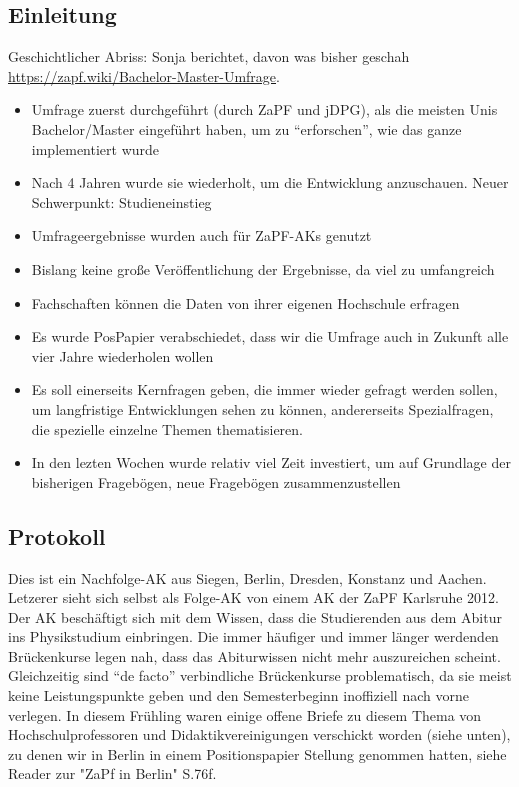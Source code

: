   \subsection*{Einleitung}
    Geschichtlicher Abriss: Sonja berichtet, davon was bisher geschah \url{https://zapf.wiki/Bachelor-Master-Umfrage}. \\
    \begin{itemize}
      \item Umfrage zuerst durchgeführt (durch ZaPF und jDPG), als die meisten Unis Bachelor/Master eingeführt haben, um zu “erforschen”, wie das ganze implementiert wurde
      \item Nach 4 Jahren wurde sie wiederholt, um die Entwicklung anzuschauen. Neuer Schwerpunkt: Studieneinstieg
      \item Umfrageergebnisse wurden auch für ZaPF-AKs genutzt
      \item Bislang keine große Veröffentlichung der Ergebnisse, da viel zu umfangreich
      \item Fachschaften können die Daten von ihrer eigenen Hochschule erfragen
      \item Es wurde PosPapier verabschiedet, dass wir die Umfrage auch in Zukunft alle vier Jahre wiederholen wollen
      \item Es soll einerseits Kernfragen geben, die immer wieder gefragt werden sollen, um langfristige Entwicklungen sehen zu können, andererseits Spezialfragen, die spezielle einzelne Themen thematisieren.
      \item In den lezten Wochen wurde relativ viel Zeit investiert, um auf Grundlage der bisherigen Fragebögen, neue Fragebögen zusammenzustellen
    \end{itemize}

  \subsection*{Protokoll}
    Dies ist ein Nachfolge-AK aus Siegen, Berlin, Dresden, Konstanz und Aachen. Letzerer sieht sich selbst als Folge-AK von einem AK der ZaPF Karlsruhe 2012. \\

    Der AK beschäftigt sich mit dem Wissen, dass die Studierenden aus dem Abitur ins Physikstudium einbringen. Die immer häufiger und immer länger werdenden Brückenkurse legen nah, dass das Abiturwissen nicht mehr auszureichen scheint. Gleichzeitig sind ``de facto'' verbindliche Brückenkurse problematisch, da sie meist keine Leistungspunkte geben und den Semesterbeginn inoffiziell nach vorne verlegen. In diesem Frühling waren einige offene Briefe zu diesem Thema von Hochschulprofessoren und Didaktikvereinigungen verschickt worden (siehe unten), zu denen wir in Berlin in einem Positionspapier Stellung genommen hatten, siehe Reader zur "ZaPf in Berlin" S.76f. \\

